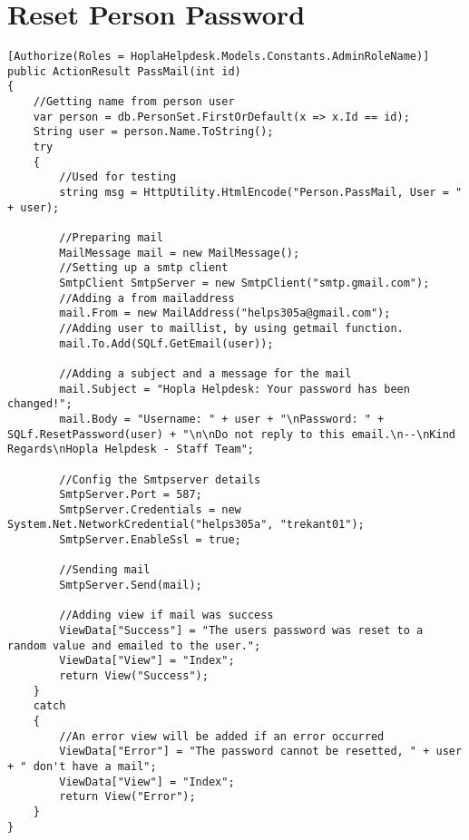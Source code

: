 \section{Reset Person Password}
\label{sec:resetpersonpassword}

\begin{lstlisting}[style=sourceCode, caption=\myCaption{The \me{PassMail} method}, label=lst:passmail,float=hp]
[Authorize(Roles = HoplaHelpdesk.Models.Constants.AdminRoleName)]
public ActionResult PassMail(int id)
{
    //Getting name from person user
    var person = db.PersonSet.FirstOrDefault(x => x.Id == id);
    String user = person.Name.ToString();
    try
    {
        //Used for testing
        string msg = HttpUtility.HtmlEncode("Person.PassMail, User = " + user);
            
        //Preparing mail
        MailMessage mail = new MailMessage();
        //Setting up a smtp client
        SmtpClient SmtpServer = new SmtpClient("smtp.gmail.com");
        //Adding a from mailaddress
        mail.From = new MailAddress("helps305a@gmail.com");
        //Adding user to maillist, by using getmail function.
        mail.To.Add(SQLf.GetEmail(user));

        //Adding a subject and a message for the mail
        mail.Subject = "Hopla Helpdesk: Your password has been changed!";
        mail.Body = "Username: " + user + "\nPassword: " + SQLf.ResetPassword(user) + "\n\nDo not reply to this email.\n--\nKind Regards\nHopla Helpdesk - Staff Team";

        //Config the Smtpserver details
        SmtpServer.Port = 587;
        SmtpServer.Credentials = new System.Net.NetworkCredential("helps305a", "trekant01");
        SmtpServer.EnableSsl = true;

        //Sending mail
        SmtpServer.Send(mail);

        //Adding view if mail was success
        ViewData["Success"] = "The users password was reset to a random value and emailed to the user.";
        ViewData["View"] = "Index";
        return View("Success");
    }
    catch
    {
        //An error view will be added if an error occurred
        ViewData["Error"] = "The password cannot be resetted, " + user + " don't have a mail";
        ViewData["View"] = "Index";
        return View("Error");
    }
}
\end{lstlisting}


